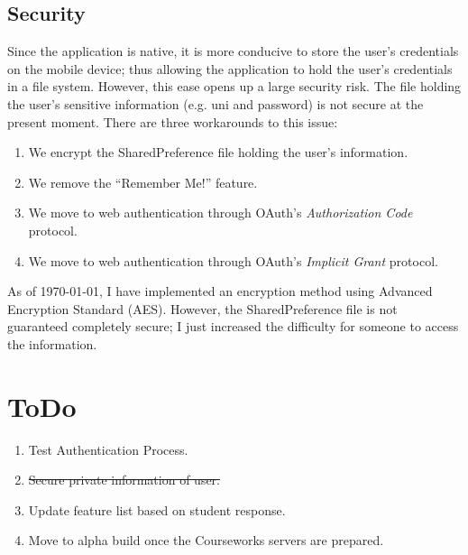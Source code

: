 \documentclass{article}
\begin{document}
\subsection{Security}
Since the application is native, it is more conducive to store the user's credentials on 
the mobile device; thus allowing the application to hold the user's credentials in a file 
system. However, this ease opens up a large security risk. The file holding the user's 
sensitive information (e.g. uni and password) is not secure at the present moment. There 
are three workarounds to this issue:
 \begin{enumerate}
    \item   We encrypt the SharedPreference file holding the user's information.
    \item   We remove the ``Remember Me!'' feature.
    \item   We move to web authentication through OAuth's \emph{Authorization Code}     
            protocol.
    \item   We move to web authentication through OAuth's \emph{Implicit Grant} protocol.
\end{enumerate}
As of \today, I have implemented an encryption method using Advanced Encryption Standard (AES). However, the SharedPreference file is not guaranteed completely secure; I just increased the difficulty for someone to access the information.

\section{ToDo}
\begin{enumerate}
    \item   Test Authentication Process.
    \item   \st{Secure private information of user.}
    \item   Update feature list based on student response.
    \item   Move to alpha build once the Courseworks servers are prepared.
\end{enumerate}
\end{document}
